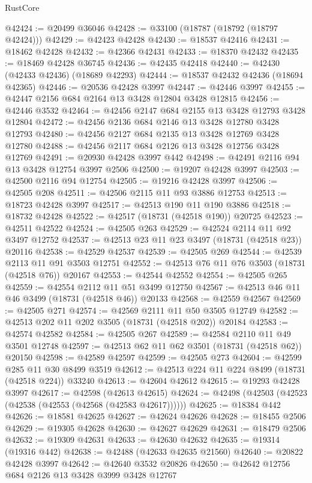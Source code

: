 \begin{lexlean}{RustCore}
\begin{coremodule}
@42424 := @20499 @36046
@42428 := @33100 (@18787 (@18792 (@18797 @42424)))
@42429 := @42423 @42428
@42430 := @18537 @42416
@42431 := @18462 @42428
@42432 := @42366 @42431
@42433 := @18370 @42432
@42435 := @18469 @42428 @36745
@42436 := @42435 @42418
@42440 := @42430 (@42433 @42436) (@18689 @42293)
@42444 := @18537 @42432 @42436 (@18694 @42365)
@42446 := @20536 @42428 @3997
@42447 := @42446 @3997
@42455 := @42447 @2156 @684 @2164 @13 @3428 @12804 @3428 @12815
@42456 := @42446 @3532
@42464 := @42456 @2147 @684 @2155 @13 @3428 @12793 @3428 @12804
@42472 := @42456 @2136 @684 @2146 @13 @3428 @12780 @3428 @12793
@42480 := @42456 @2127 @684 @2135 @13 @3428 @12769 @3428 @12780
@42488 := @42456 @2117 @684 @2126 @13 @3428 @12756 @3428 @12769
@42491 := @20930 @42428 @3997 @442
@42498 := @42491 @2116 @94 @13 @3428 @12754 @3997 @2506
@42500 := @19207 @42428 @3997
@42503 := @42500 @2116 @94 @12754
@42505 := @19216 @42428 @3997
@42506 := @42505 @208
@42511 := @42506 @2115 @11 @93 @3886 @12753
@42513 := @18723 @42428 @3997
@42517 := @42513 @190 @11 @190 @3886
@42518 := @18732 @42428
@42522 := @42517 (@18731 (@42518 @190)) @20725
@42523 := @42511 @42522
@42524 := @42505 @263
@42529 := @42524 @2114 @11 @92 @3497 @12752
@42537 := @42513 @23 @11 @23 @3497 (@18731 (@42518 @23)) @20116
@42538 := @42529 @42537
@42539 := @42505 @269
@42544 := @42539 @2113 @11 @91 @3503 @12751
@42552 := @42513 @76 @11 @76 @3503 (@18731 (@42518 @76)) @20167
@42553 := @42544 @42552
@42554 := @42505 @265
@42559 := @42554 @2112 @11 @51 @3499 @12750
@42567 := @42513 @46 @11 @46 @3499 (@18731 (@42518 @46)) @20133
@42568 := @42559 @42567
@42569 := @42505 @271
@42574 := @42569 @2111 @11 @50 @3505 @12749
@42582 := @42513 @202 @11 @202 @3505 (@18731 (@42518 @202)) @20184
@42583 := @42574 @42582
@42584 := @42505 @267
@42589 := @42584 @2110 @11 @49 @3501 @12748
@42597 := @42513 @62 @11 @62 @3501 (@18731 (@42518 @62)) @20150
@42598 := @42589 @42597
@42599 := @42505 @273
@42604 := @42599 @285 @11 @30 @8499 @3519
@42612 := @42513 @224 @11 @224 @8499 (@18731 (@42518 @224)) @33240
@42613 := @42604 @42612
@42615 := @19293 @42428 @3997
@42617 := @42598 (@42613 @42615)
@42624 := @42498 (@42503 (@42523 (@42538 (@42553 (@42568 (@42583 @42617))))))
@42625 := @18384 @442
@42626 := @18581 @42625
@42627 := @42624 @42626
@42628 := @18455 @2506
@42629 := @19305 @42628
@42630 := @42627 @42629
@42631 := @18479 @2506
@42632 := @19309 @42631
@42633 := @42630 @42632
@42635 := @19314 (@19316 @442)
@42638 := @42488 (@42633 @42635 @21560)
@42640 := @20822 @42428 @3997
@42642 := @42640 @3532 @20826
@42650 := @42642 @12756 @684 @2126 @13 @3428 @3999 @3428 @12767

\end{coremodule}
\end{lexlean}
